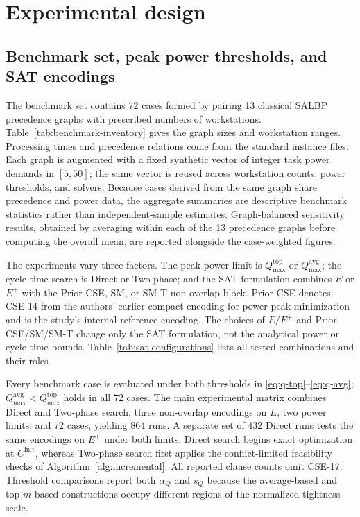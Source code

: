 \documentclass[]{interact}
\theoremstyle{plain}
\theoremstyle{definition}
\theoremstyle{remark}
\newcommand{\Cinit}{C^{\mathrm{init}}}
\begin{document}
\section{Experimental design}
\label{sec:experiment}

\subsection{Benchmark set, peak power thresholds, and SAT encodings}

The benchmark set contains 72 cases formed by pairing 13 classical SALBP precedence graphs with prescribed numbers of workstations. Table~\ref{tab:benchmark-inventory} gives the graph sizes and workstation ranges. Processing times and precedence relations come from the standard instance files. Each graph is augmented with a fixed synthetic vector of integer task power demands in $[5,50]$; the same vector is reused across workstation counts, power thresholds, and solvers. Because cases derived from the same graph share precedence and power data, the aggregate summaries are descriptive benchmark statistics rather than independent-sample estimates. Graph-balanced sensitivity results, obtained by averaging within each of the 13 precedence graphs before computing the overall mean, are reported alongside the case-weighted figures.





The experiments vary three factors. The peak power limit is $Q_{\max}^{\mathrm{top}}$ or $Q_{\max}^{\mathrm{avg}}$; the cycle-time search is Direct or Two-phase; and the SAT formulation combines $E$ or $E^+$ with the Prior CSE, SM, or SM-T non-overlap block. Prior CSE denotes CSE-14 from the authors' earlier compact encoding for power-peak minimization \citep{VanKieu2025Compact} and is the study's internal reference encoding. The choices of $E/E^+$ and Prior CSE/SM/SM-T change only the SAT formulation, not the analytical power or cycle-time bounds. Table~\ref{tab:sat-configurations} lists all tested combinations and their roles.



Every benchmark case is evaluated under both thresholds in \eqref{eq:q-top}--\eqref{eq:q-avg}; $Q_{\max}^{\mathrm{avg}}<Q_{\max}^{\mathrm{top}}$ holds in all 72 cases. The main experimental matrix combines Direct and Two-phase search, three non-overlap encodings on $E$, two power limits, and 72 cases, yielding 864 runs. A separate set of 432 Direct runs tests the same encodings on $E^+$ under both limits. Direct search begins exact optimization at $\Cinit$, whereas Two-phase search first applies the conflict-limited feasibility checks of Algorithm~\ref{alg:incremental}. All reported clause counts omit CSE-17. Threshold comparisons report both $\alpha_Q$ and $s_Q$ because the average-based and top-$m$-based constructions occupy different regions of the normalized tightness scale.
\end{document}
